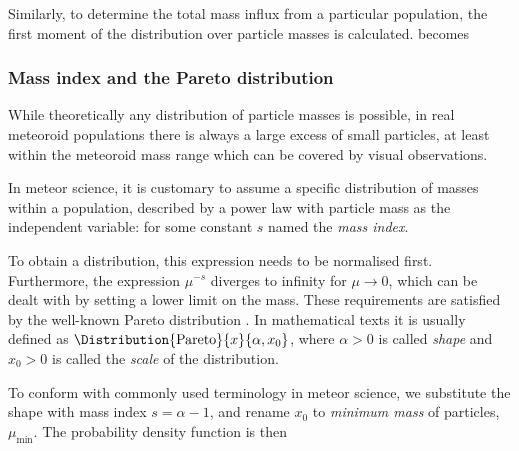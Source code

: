             Similarly, to determine the total mass influx from a particular population, the first moment
            of the distribution over particle masses is calculated.
             becomes

        \subsubsection{Mass index and the Pareto distribution} \label{moms}
            While theoretically any distribution of particle masses is possible,
            in real meteoroid populations there is always a large excess of small particles,
            at least within the meteoroid mass range which can be covered by visual observations.

            In meteor science, it is customary to assume a specific distribution of masses within a population,
            described by a power law with particle mass as the independent variable:
            for some constant $s$ named the \emph{mass index}.

            To obtain a distribution, this expression needs to be normalised first.
            Furthermore, the expression $\mu^{-s}$ diverges to infinity for $\mu \to 0$,
            which can be dealt with by setting a lower limit on the mass.
            These requirements are satisfied by the well-known Pareto distribution \citep{arnold1983}.
            In mathematical texts it is usually defined as $\Distribution{\mathrm{Pareto}}{x}{\alpha, x_0}$,
            where $\alpha > 0$ is called \emph{shape} and $x_0 > 0$ is called the \emph{scale} of the distribution.

            To conform with commonly used terminology in meteor science, we substitute the shape with mass index
            $s = \alpha - 1$, and rename $x_0$ to \emph{minimum mass} of particles, $\mu_\mathrm{min}$.
            The probability density function is then

